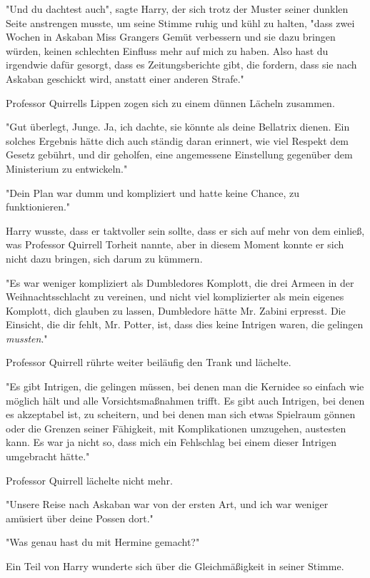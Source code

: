 {"Und du dachtest auch", sagte Harry, der sich trotz der Muster seiner dunklen Seite anstrengen musste, um seine Stimme ruhig und kühl zu halten, "dass zwei Wochen in Askaban Miss Grangers Gemüt verbessern und sie dazu bringen würden, keinen schlechten Einfluss mehr auf mich zu haben. Also hast du irgendwie dafür gesorgt, dass es Zeitungsberichte gibt, die fordern, dass sie nach Askaban geschickt wird, anstatt einer anderen Strafe."

Professor Quirrells Lippen zogen sich zu einem dünnen Lächeln zusammen.

"Gut überlegt, Junge. Ja, ich dachte, sie könnte als deine Bellatrix dienen. Ein solches Ergebnis hätte dich auch ständig daran erinnert, wie viel Respekt dem Gesetz gebührt, und dir geholfen, eine angemessene Einstellung gegenüber dem Ministerium zu entwickeln."

"Dein Plan war dumm und kompliziert und hatte keine Chance, zu funktionieren."

Harry wusste, dass er taktvoller sein sollte, dass er sich auf mehr von dem einließ, was Professor Quirrell Torheit nannte, aber in diesem Moment konnte er sich nicht dazu bringen, sich darum zu kümmern.

"Es war weniger kompliziert als Dumbledores Komplott, die drei Armeen in der Weihnachtsschlacht zu vereinen, und nicht viel komplizierter als mein eigenes Komplott, dich glauben zu lassen, Dumbledore hätte Mr. Zabini erpresst. Die Einsicht, die dir fehlt, Mr. Potter, ist, dass dies keine Intrigen waren, die gelingen \emph{mussten}."

Professor Quirrell rührte weiter beiläufig den Trank und lächelte.

"Es gibt Intrigen, die gelingen müssen, bei denen man die Kernidee so einfach wie möglich hält und alle Vorsichtsmaßnahmen trifft. Es gibt auch Intrigen, bei denen es akzeptabel ist, zu scheitern, und bei denen man sich etwas Spielraum gönnen oder die Grenzen seiner Fähigkeit, mit Komplikationen umzugehen, austesten kann. Es war ja nicht so, dass mich ein Fehlschlag bei einem dieser Intrigen umgebracht hätte."

Professor Quirrell lächelte nicht mehr.

"Unsere Reise nach Askaban war von der ersten Art, und ich war weniger amüsiert über deine Possen dort."

"Was genau hast du mit Hermine gemacht?"

Ein Teil von Harry wunderte sich über die Gleichmäßigkeit in seiner Stimme.

}
